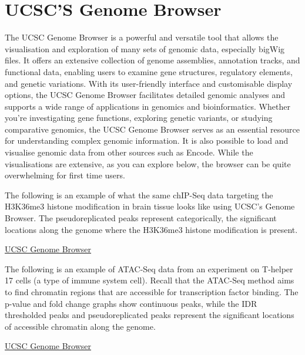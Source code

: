 \documentclass[
]{book}
\begin{document}
\section{UCSC'S Genome Browser}\label{ucscs-genome-browser}

The UCSC Genome Browser is a powerful and versatile tool that allows the visualisation and exploration of many sets of genomic data, especially bigWig files. It offers an extensive collection of genome assemblies, annotation tracks, and functional data, enabling users to examine gene structures, regulatory elements, and genetic variations. With its user-friendly interface and customisable display options, the UCSC Genome Browser facilitates detailed genomic analyses and supports a wide range of applications in genomics and bioinformatics. Whether you're investigating gene functions, exploring genetic variants, or studying comparative genomics, the UCSC Genome Browser serves as an essential resource for understanding complex genomic information. It is also possible to load and visualise genomic data from other sources such as Encode. While the visualisations are extensive, as you can explore below, the browser can be quite overwhelming for first time users.

The following is an example of what the same chIP-Seq data targeting the H3K36me3 histone modification in brain tissue looks like using UCSC's Genome Browser. The pseudoreplicated peaks represent categorically, the significant locations along the genome where the H3K36me3 histone modification is present.

\href{https://genome.ucsc.edu/cgi-bin/hgTracks?db=hg38&lastVirtModeType=default&lastVirtModeExtraState=&virtModeType=default&virtMode=0&nonVirtPosition=&position=chr1\%3A11084744\%2D11095920&hgsid=2307713234_Kap236Tjt6ZGnnNrXMkIhq2Ajn27}{UCSC Genome Browser}

The following is an example of ATAC-Seq data from an experiment on T-helper 17 cells (a type of immune system cell). Recall that the ATAC-Seq method aims to find chromatin regions that are accessible for transcription factor binding. The p-value and fold change graphs show continuous peaks, while the IDR thresholded peaks and pseudoreplicated peaks represent the significant locations of accessible chromatin along the genome.

\href{https://genome.ucsc.edu/cgi-bin/hgTracks?db=hg38&lastVirtModeType=default&lastVirtModeExtraState=&virtModeType=default&virtMode=0&nonVirtPosition=&position=chr1\%3A88379533\%2D113275174&hgsid=2307721306_mcnECXS4Hy0fNQ4yz3ZQTL7nimkW}{UCSC Genome Browser}
\end{document}
